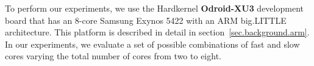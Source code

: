 To perform our experiments, we use the Hardkernel \textbf{Odroid-XU3} development board that has an 8-core Samsung Exynos 5422 with an ARM big.LITTLE architecture. 
This platform is described in detail in section~\ref{sec.background.arm}.
In our experiments, we evaluate a set of possible combinations of fast and slow cores varying the total number of cores from two to eight. 




